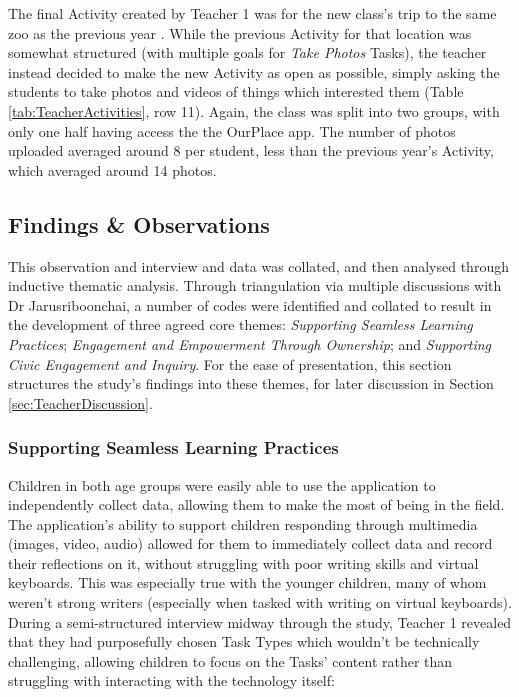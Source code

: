 The final Activity created by Teacher 1 was for the new class's trip to the same zoo as the previous year . While the previous Activity for that location was somewhat structured (with multiple goals for \textit{Take Photos} Tasks), the teacher instead decided to make the new Activity as open as possible, simply asking the students to take photos and videos of things which interested them (Table \ref{tab:TeacherActivities}, row 11). Again, the class was split into two groups, with only one half having access the the OurPlace app. The number of photos uploaded averaged around 8 per student, less than the previous year's Activity, which averaged around 14 photos.

\subsection{Findings \& Observations}

This observation and interview and data was collated, and then analysed through inductive thematic analysis. Through triangulation via multiple discussions with Dr Jarusriboonchai, a number of codes were identified and collated to result in the development of three agreed core themes: \textit{Supporting Seamless Learning Practices}; \textit{Engagement and Empowerment Through Ownership}; and \textit{Supporting Civic Engagement and Inquiry}. For the ease of presentation, this section structures the study's findings into these themes, for later discussion in Section \ref{sec:TeacherDiscussion}.

\subsubsection{Supporting Seamless Learning Practices}

Children in both age groups were easily able to use the application to independently collect data, allowing them to make the most of being in the field. The application's ability to support children responding through multimedia (images, video, audio) allowed for them to immediately collect data and record their reflections on it, without struggling with poor writing skills and virtual keyboards. This was especially true with the younger children, many of whom weren't strong writers (especially when tasked with writing on virtual keyboards). During a semi-structured interview midway through the study, Teacher 1 revealed that they had purposefully chosen Task Types which wouldn't be technically challenging, allowing children to focus on the Tasks' content rather than struggling with interacting with the technology itself: 

